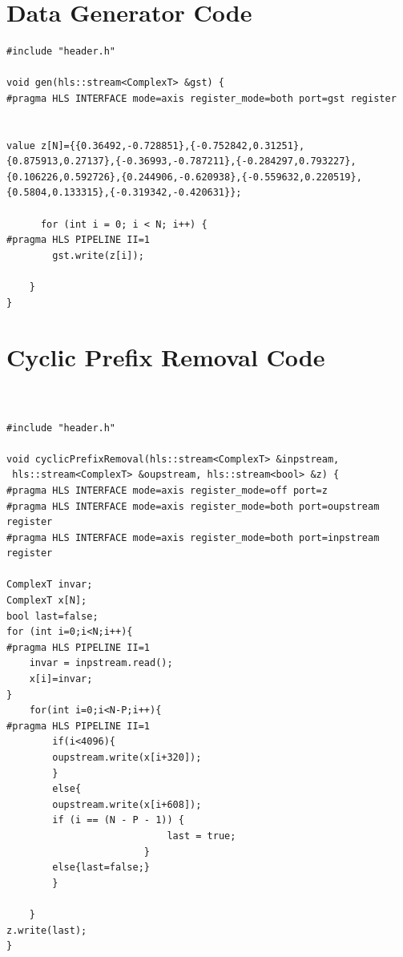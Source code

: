 \documentclass{article}
\begin{document}
\section{Data Generator Code}
\begin{lstlisting}
#include "header.h"

void gen(hls::stream<ComplexT> &gst) {
#pragma HLS INTERFACE mode=axis register_mode=both port=gst register


value z[N]={{0.36492,-0.728851},{-0.752842,0.31251},{0.875913,0.27137},{-0.36993,-0.787211},{-0.284297,0.793227},{0.106226,0.592726},{0.244906,-0.620938},{-0.559632,0.220519},{0.5804,0.133315},{-0.319342,-0.420631}};

	  for (int i = 0; i < N; i++) {
#pragma HLS PIPELINE II=1
        gst.write(z[i]);

    }
}

\end{lstlisting}
\vspace{15cm}
\section{Cyclic Prefix Removal Code}
\begin{lstlisting}


#include "header.h"

void cyclicPrefixRemoval(hls::stream<ComplexT> &inpstream,
 hls::stream<ComplexT> &oupstream, hls::stream<bool> &z) {
#pragma HLS INTERFACE mode=axis register_mode=off port=z
#pragma HLS INTERFACE mode=axis register_mode=both port=oupstream register
#pragma HLS INTERFACE mode=axis register_mode=both port=inpstream register

ComplexT invar;
ComplexT x[N];
bool last=false;
for (int i=0;i<N;i++){
#pragma HLS PIPELINE II=1
    invar = inpstream.read();
    x[i]=invar;
}
    for(int i=0;i<N-P;i++){
#pragma HLS PIPELINE II=1
    	if(i<4096){
        oupstream.write(x[i+320]);
    	}
    	else{
    	oupstream.write(x[i+608]);
    	if (i == (N - P - 1)) {
    	    	            last = true;
    	    	        }
    	else{last=false;}
    	}

    }
z.write(last);
}


\end{lstlisting}
\vspace{3cm}
\end{document}

